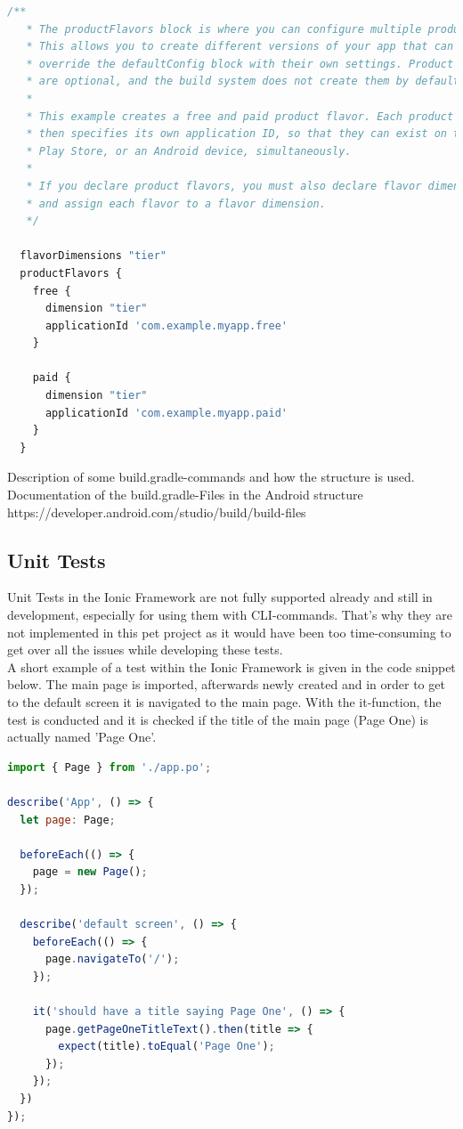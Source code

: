 \documentclass[12pt]{article}
\begin{document}
\begin{lstlisting}[language=javascript]
 /**
   * The productFlavors block is where you can configure multiple product flavors.
   * This allows you to create different versions of your app that can
   * override the defaultConfig block with their own settings. Product flavors
   * are optional, and the build system does not create them by default.
   *
   * This example creates a free and paid product flavor. Each product flavor
   * then specifies its own application ID, so that they can exist on the Google
   * Play Store, or an Android device, simultaneously.
   *
   * If you declare product flavors, you must also declare flavor dimensions
   * and assign each flavor to a flavor dimension.
   */

  flavorDimensions "tier"
  productFlavors {
    free {
      dimension "tier"
      applicationId 'com.example.myapp.free'
    }

    paid {
      dimension "tier"
      applicationId 'com.example.myapp.paid'
    }
  }

\end{lstlisting}
Description of some build.gradle-commands and how the structure is used.\\
Documentation of the build.gradle-Files in the Android structure\\
https://developer.android.com/studio/build/build-files\\

\subsection{Unit Tests}
Unit Tests in the Ionic Framework are not fully supported already and still in development, especially for using them with CLI-commands. That's why they are not implemented in this pet project as it would have been too time-consuming to get over all the issues while developing these tests.\\
A short example of a test within the Ionic Framework is given in the code snippet below. The main page is imported, afterwards newly created and in order to get to the default screen it is navigated to the main page. With the it-function, the test is conducted and it is checked if the title of the main page (Page One) is actually named 'Page One'.

\begin{lstlisting}[language=javascript]
import { Page } from './app.po';

describe('App', () => {
  let page: Page;

  beforeEach(() => {
    page = new Page();
  });

  describe('default screen', () => {
    beforeEach(() => {
      page.navigateTo('/');
    });

    it('should have a title saying Page One', () => {
      page.getPageOneTitleText().then(title => {
        expect(title).toEqual('Page One');
      });
    });
  })
});
\end{lstlisting}
\end{document}
